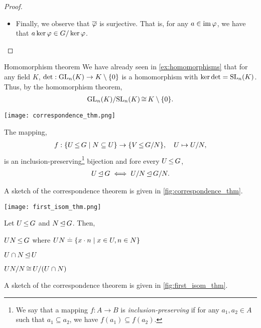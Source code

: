 \begin{proof}
\begin{itemize}
    \item Finally, we observe that $\overline{\varphi}$ is surjective. That is, for any $a \in \operatorname*{im}{\varphi}$, we have that $a \ker{\varphi} \in G/\ker{\varphi}$. \qedhere
\end{itemize}
\end{proof}

\begin{ex}{Homomorphism theorem}{}
We have already seen in \cref{ex:homomorphisms} that for any field $K$, ${\det : \mathrm{GL}_{n}(K) \to K \setminus \{0\}}$ is a homomorphism with ${\ker{\det} = \mathrm{SL}_{n}(K)}$. Thus, by the homomorphism theorem, \begin{align}
    \mathrm{GL}_{n}(K)/\mathrm{SL}_{n}(K) \operatorname*{\cong} K \setminus \{0\}.
\end{align}
\end{ex}

\begin{marginfigure}
    \texttt{[image: correspondence\_thm.png]}
    \caption{Sketch of the correspondence of subgroups $U_i$ ``between'' $G$ and $N$ and the subgroups $\Quot{U_i}{N}$ ``between'' $\Quot{G}{N}$ and $\Quot{N}{N}$.}\label{fig:correspondence_thm}
\end{marginfigure}

\begin{thm}
The mapping, \begin{align}
    f : \{U \operatorname*{\leq} G \mid N \subseteq U\} \to \{V \operatorname*{\leq} G/N\},\quad U \mapsto U/N,
\end{align} is an inclusion-preserving\footnote{We say that a mapping ${f : A \to B}$ is \emph{inclusion-preserving} if for any $a_1, a_2 \in A$ such that ${a_1 \subseteq a_2}$, we have ${f(a_1) \subseteq f(a_2)}$.} bijection and fore every $U \operatorname*{\leq} G$, \begin{align}
    U \operatorname*{\trianglelefteq} G \iff U/N \operatorname*{\trianglelefteq} G/N.
\end{align}
\end{thm} \noindent A sketch of the correspondence theorem is given in \cref{fig:correspondence_thm}.

\begin{marginfigure}
    \texttt{[image: first\_isom\_thm.png]}
    \caption{Sketch of the first isomorphism theorem.}\label{fig:first_isom_thm}
\end{marginfigure}

\begin{thm}
Let $U \operatorname*{\leq} G$ and $N \operatorname*{\trianglelefteq} G$. Then, \begin{thmlist}
    \item $U N \operatorname*{\leq} G$ where $U N \overset{.}{=} \{x \cdot n \mid x \in U, n \in N\}$
    \item $U \cap N \operatorname*{\trianglelefteq} U$
    \item $UN/N \operatorname*{\cong} U/(U \cap N)$
\end{thmlist}
\end{thm} \noindent A sketch of the correspondence theorem is given in \cref{fig:first_isom_thm}.

